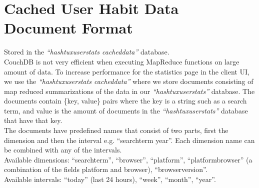 \section{Cached User Habit Data Document Format}
Stored in the \textit{``hashtux\textunderscore userstats\textunderscore
cached\textunderscore data''} database. \\

CouchDB is not very efficient when executing MapReduce functions on large amount
of data. To increase performance for the statistics page in the client UI, we
use the \textit{``hashtux\textunderscore userstats\textunderscore
cached\textunderscore data''} where we store documents consisting of map reduced
summarizations of the data in our \textit{``hashtux\textunderscore userstats''}
database. The documents contain \{key, value\} pairs where the key is a string
such as a search term, and value is the amount of documents in the
\textit{``hashtux\textunderscore userstats''} database that have that key. \\

The documents have predefined names that consist of two parts, first the
dimension and then the interval e.g. ``search\textunderscore term\textunderscore
year''.  Each dimension name can be combined with any of the intervals.\\

Available dimensions: ``search\textunderscore term'', ``browser'', ``platform'',
``platform\textunderscore browser'' (a combination of the fields platform and
browser), ``browser\textunderscore version''. \\

Available intervals: ``today'' (last 24 hours), ``week'', ``month'', ``year''.